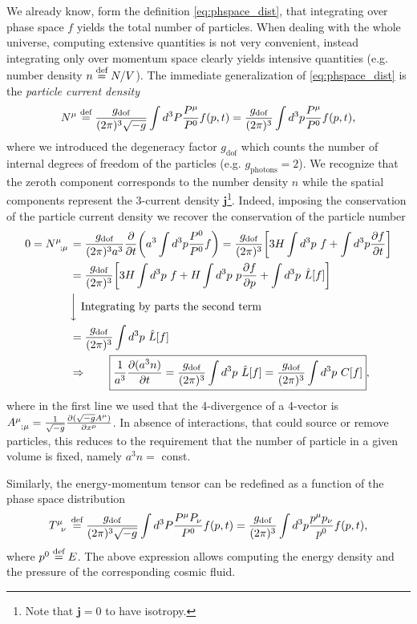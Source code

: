 We already know, form the definition \eqref{eq:phspace_dist}, that integrating over phase space $f$ yields the total number of particles. When dealing with the whole universe, computing extensive quantities is not very convenient, instead integrating only over momentum space clearly yields intensive quantities (e.g. number density $n\stackrel{\text{def}}{=} N/V$). The immediate generalization of \eqref{eq:phspace_dist} is the \emph{particle current density}
\begin{equation}
    N^\mu\stackrel{\text{def}}{=}\frac{g_\text{dof}}{(2\pi)^3\sqrt{-g}}\int d^3P\frac{P^\mu}{P^0} f(p,t)=\frac{g_\text{dof}}{(2\pi)^3}\int d^3p\frac{P^\mu}{P^0} f(p,t),
    \label{eq:current_density}
\end{equation}
where we introduced the degeneracy factor $g_\text{dof}$ which counts the number of internal degrees of freedom of the particles (e.g. $g_\text{photons}=2$).  We recognize that the zeroth component corresponds to the number density $n$ while the spatial components represent the 3-current density $\mathbf j$\footnote{Note that $\mathbf j=0$ to have isotropy.}. Indeed, imposing the conservation of the particle current density we recover the conservation of the particle number
\begin{align*}
    0=\tensor{N}{^\mu_;_\mu}&=\frac{g_\text{dof}}{(2\pi)^3a^3}\frac{\partial }{\partial t}\bigg(a^3\int d^3p\frac{P^0}{P^0}f\bigg)=\frac{g_\text{dof}}{(2\pi)^3}\bigg[3H\int d^3p\ f+ \int d^3p\frac{\partial f}{\partial t}\bigg]\\&=\frac{g_\text{dof}}{(2\pi)^3}\bigg[3H\int d^3p\ f+H\int d^3p\ p\frac{\partial f}{\partial p}+ \int d^3p\ \hat L[f]\bigg]\\
    &\bigg\downarrow\ \text{Integrating by parts the second term}\\
    &=\frac{g_\text{dof}}{(2\pi)^3}\int d^3p\ \hat L[f]\\
    &\Rightarrow\qquad \boxed{\frac{1}{a^3}\frac{\partial (a^3n)}{\partial t}=\frac{g_\text{dof}}{(2\pi)^3}\int d^3p\ \hat L[f]=\frac{g_\text{dof}}{(2\pi)^3}\int d^3p\ C[f]},
\end{align*} 
where in the first line we used that the 4-divergence of a 4-vector is $\tensor{A}{^\mu_;_\mu}=\tfrac{1}{\sqrt{-g}}\tfrac{\partial (\sqrt{-g}A^\mu)}{\partial x^\mu}$. In absence of interactions, that could source or remove particles, this reduces to the requirement that the number of particle in a given volume is fixed, namely $a^3 n=$ const.

Similarly, the energy-momentum tensor can be redefined as a function of the phase space distribution
\begin{equation}
    \tensor{T}{^\mu_\nu}\defeq \frac{g_\text{dof}}{(2\pi)^3\sqrt{-g}}\int d^3P\frac{P^\mu P_\nu}{P^0}f(p,t)=\frac{g_\text{dof}}{(2\pi)^3}\int d^3p\frac{p^\mu p_\nu}{p^0}f(p,t),
    \label{eq:SressEnergyT_phasespace}
\end{equation}
where $p^0\stackrel{\text{def}}{=} E$. The above expression allows computing the energy density and the pressure of the corresponding cosmic fluid.

